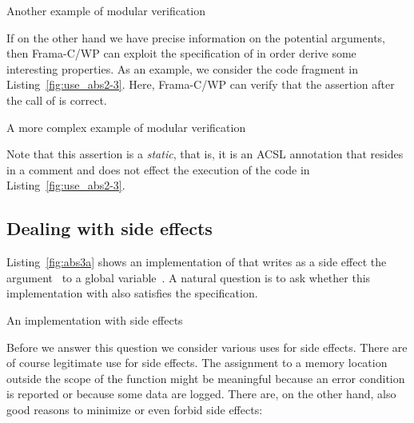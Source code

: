 \begin{listing}[hbt]
\begin{minipage}{\textwidth}

\end{minipage}
\caption{\label{fig:use_abs2-2} Another example of modular verification}
\end{listing}

\clearpage

If on the other hand we have precise information on the potential
arguments, then Frama-C\slash WP can exploit the specification of 
 in order derive some interesting properties.
As an example, we consider the code fragment in Listing~\ref{fig:use_abs2-3}.
Here, Frama-C\slash WP can verify that the assertion after 
the call of  is correct.


\begin{listing}[hbt]
\begin{minipage}{\textwidth}

\end{minipage}
\caption{\label{fig:use_abs2-3} A more complex example of modular verification}
\end{listing}

Note that this assertion is a \emph{static}, that is, it is
an ACSL annotation that resides in a comment and does not effect
the execution of the code in Listing~\ref{fig:use_abs2-3}.

\clearpage

\subsection{Dealing with side effects}

Listing~\ref{fig:abs3a} shows an implementation of 
that writes as a side effect the argument~ to a global variable~.
A natural question is to ask whether this implementation with
also satisfies the specification.

\begin{listing}[hbt]
\begin{minipage}{\textwidth}

\end{minipage}
\caption{\label{fig:abs3a} An implementation with side effects}
\end{listing}

\FloatBarrier

Before we answer this question we consider various uses for side effects.
There are of course legitimate use for side effects.
The assignment to a memory location outside the scope of the function
might be meaningful because an error condition is reported or because
some data are logged.
There are, on the other hand, also good reasons to minimize or even forbid side 
effects:

